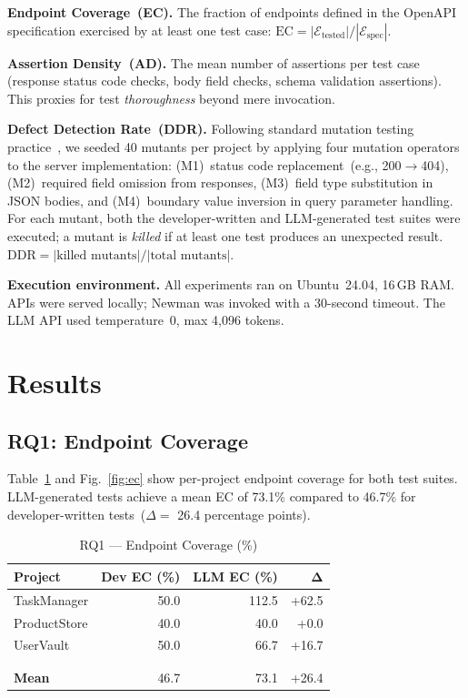 \documentclass[sigconf,review,anonymous=false]{acmart}
\begin{document}
\textbf{Endpoint Coverage~(EC).} The fraction of endpoints defined in the
OpenAPI specification exercised by at least one test case:
$\text{EC} = |\mathcal{E}_{\text{tested}}| / |\mathcal{E}_{\text{spec}}|$.

\textbf{Assertion Density~(AD).} The mean number of assertions per test case
(response status code checks, body field checks, schema validation assertions).
This proxies for test \emph{thoroughness} beyond mere invocation.

\textbf{Defect Detection Rate~(DDR).} Following standard mutation
testing practice~\cite{Papadakis2019}, we seeded 40 mutants per project
by applying four mutation operators to the server implementation: (M1)~status
code replacement~(e.g., 200$\to$404), (M2)~required field omission from
responses, (M3)~field type substitution in JSON bodies, and
(M4)~boundary value inversion in query parameter handling.
For each mutant, both the developer-written and LLM-generated test suites were
executed; a mutant is \emph{killed} if at least one test produces an unexpected
result. $\text{DDR} = |\text{killed mutants}| / |\text{total mutants}|$.

\smallskip\noindent\textbf{Execution environment.}
All experiments ran on Ubuntu~24.04, 16\,GB RAM. APIs were served locally; Newman was invoked with a 30-second timeout. The LLM API used temperature~0, max 4,096 tokens.

\section{Results}\label{sec:results}

\subsection{RQ1: Endpoint Coverage}

Table~\ref{tab:rq1} and Fig.~\ref{fig:ec} show per-project endpoint coverage for both test suites.
LLM-generated tests achieve a mean EC of 73.1\% compared to 46.7\%
for developer-written tests~($\Delta = $ 26.4 percentage points).

\begin{table}[t]
  \caption{RQ1 — Endpoint Coverage (\%)}
  \label{tab:rq1}
  \centering
  \small
  \begin{tabular}{lrrr}
    \toprule
    \textbf{Project} & \textbf{Dev EC (\%)} & \textbf{LLM EC (\%)} & $\boldsymbol{\Delta}$ \\
    \midrule
    TaskManager  & 50.0 & 112.5 & +62.5 \\
    ProductStore & 40.0 &  40.0 &  +0.0 \\
    UserVault    & 50.0 &  66.7 & +16.7 \\
     \\
     \\
    \midrule
    \textbf{Mean}    & 46.7 & 73.1 & +26.4 \\
    \bottomrule
  \end{tabular}
\end{table}
\end{document}
